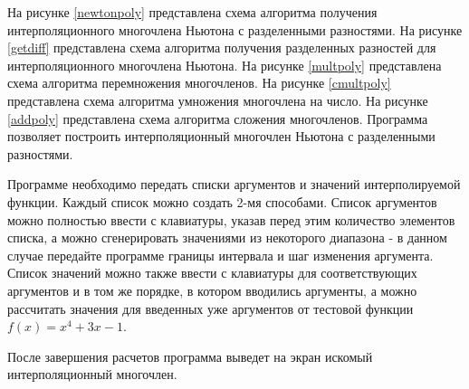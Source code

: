 На рисунке \ref{newtonpoly} представлена схема алгоритма получения интерполяционного многочлена Ньютона с разделенными разностями.
На рисунке \ref{getdiff} представлена схема алгоритма получения разделенных разностей для интерполяционного многочлена Ньютона.
На рисунке \ref{multpoly} представлена схема алгоритма перемножения многочленов.
На рисунке \ref{cmultpoly} представлена схема алгоритма умножения многочлена на число.
На рисунке \ref{addpoly} представлена схема алгоритма сложения многочленов.
\clearpage
{}
Программа позволяет построить интерполяционный многочлен Ньютона с разделенными разностями.

Программе необходимо передать списки аргументов и значений интерполируемой функции. Каждый список можно создать 2-мя способами. Список аргументов можно полностью ввести с клавиатуры, указав перед этим количество элементов списка, а можно сгенерировать значениями из некоторого диапазона - в данном случае передайте программе границы интервала и шаг изменения аргумента. Список значений можно также ввести с клавиатуры для соответствующих аргументов и в том же порядке, в котором вводились аргументы, а можно рассчитать значения для введенных уже аргументов от тестовой функции $f(x)=x^4+3x-1$.

После завершения расчетов программа выведет на экран искомый интерполяционный многочлен.

